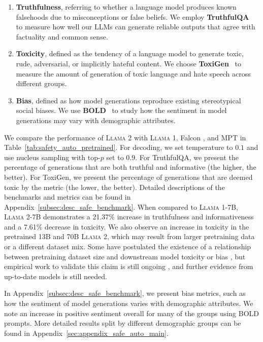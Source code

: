 \documentclass{article}
\newcommand{\anise}{\textsc{Llama 1}\xspace}
\newcommand{\cinnamon}{\textsc{Llama 2}\xspace}
\begin{document}
\begin{enumerate}
    \item \textbf{Truthfulness}, referring to whether a language model produces known falsehoods due to misconceptions or false beliefs. We employ \textbf{TruthfulQA}~\citep{lin2021truthfulqa} to measure how well our LLMs can generate reliable outputs that agree with factuality and common sense. 
    \item \textbf{Toxicity}, defined as the tendency of a language model to generate toxic, rude, adversarial, or implicitly hateful content.  We choose \textbf{ToxiGen}~\citep{hartvigsen2022toxigen} to measure the amount of generation of toxic language and hate speech across different groups.
    \item \textbf{Bias}, defined as how model generations reproduce existing stereotypical social biases. 
    We use \textbf{BOLD}~\citep{dhamala2021bold} to study how the sentiment in model generations may vary with demographic attributes.
\end{enumerate}

We compare the performance of \cinnamon with \anise \citep{Touvron2023LLaMAOA}, Falcon \citep{falcon40b}, and MPT \citep{MosaicML2023Introducing} in Table~\ref{tab:safety_auto_pretrained}. For decoding, we set temperature to $0.1$ and use nucleus sampling \citep{nucleus_sampling} with top-$p$ set to $0.9$. For TruthfulQA, we present the percentage of generations that are both truthful and informative (the higher, the better). For ToxiGen, we present the percentage of generations that are deemed toxic by the metric (the lower, the better).  
Detailed descriptions of the benchmarks and metrics can be found in Appendix~\ref{subsec:desc_safe_benchmark}. 
When compared to \anise-7B, \cinnamon-7B demonstrates 
a 21.37\% increase in truthfulness and informativeness and 
a 7.61\% decrease in toxicity. 
We also observe an increase in toxicity in the pretrained 13B and 70B \cinnamon{}, which may result from larger pretraining data or a different dataset mix. Some have postulated the existence of a relationship between pretraining dataset size and downstream model toxicity or bias \citep{bender2021dangers}, but empirical work to validate this claim is still ongoing \citep{dodge-etal-2021-documenting, smith2021hi, tal-etal-2022-fewer}, and further evidence from up-to-date models is still needed. 

In Appendix~\ref{subsec:desc_safe_benchmark}, we present bias metrics, such as how the sentiment of model generations varies with demographic attributes. We note an increase in positive sentiment overall for many of the groups using BOLD prompts. More detailed results split by different demographic groups can be found in Appendix~\ref{sec:appendix_safe_auto_main}. 
\end{document}
